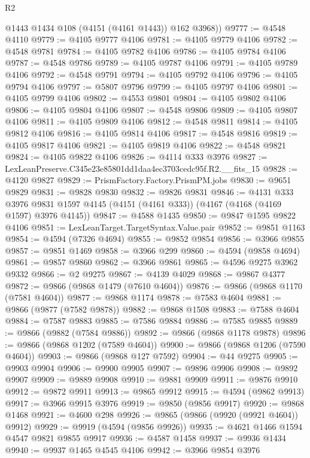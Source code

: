 \begin{lexlean}{R2}
\begin{coremodule}
        @1443
        @1434
        @108
        (@4151 (@4161 @1443))
        @162
        @3968))
@9777 := @4548 @4110
@9779 := @4105 @9777 @4106
@9781 := @4105 @9779 @4106
@9782 := @4548 @9781
@9784 := @4105 @9782 @4106
@9786 := @4105 @9784 @4106
@9787 := @4548 @9786
@9789 := @4105 @9787 @4106
@9791 := @4105 @9789 @4106
@9792 := @4548 @9791
@9794 := @4105 @9792 @4106
@9796 := @4105 @9794 @4106
@9797 := @5807 @9796
@9799 := @4105 @9797 @4106
@9801 := @4105 @9799 @4106
@9802 := @4553 @9801
@9804 := @4105 @9802 @4106
@9806 := @4105 @9804 @4106
@9807 := @4548 @9806
@9809 := @4105 @9807 @4106
@9811 := @4105 @9809 @4106
@9812 := @4548 @9811
@9814 := @4105 @9812 @4106
@9816 := @4105 @9814 @4106
@9817 := @4548 @9816
@9819 := @4105 @9817 @4106
@9821 := @4105 @9819 @4106
@9822 := @4548 @9821
@9824 := @4105 @9822 @4106
@9826 := @4114 @333 @3976
@9827 := LexLeanPreserve.C345e23e85801dd1daa4ec3703cedc95f.R2.__fits_15
@9828 := @4120 @9827
@9829 := PrismFactory.Factory.PrismPM.jobs
@9830 := @9651 @9829
@9831 := @9828 @9830
@9832 := @9826 @9831
@9846 := @4131
    @333
    @3976
    @9831
    @1597
    @4145
    (@4151 (@4161 @333))
    (@4167 (@4168 (@4169 @1597) @3976 @4145))
@9847 := @4588 @1435
@9850 := @9847 @1595 @9822 @4106
@9851 := LexLeanTarget.TargetSyntax.Value.pair
@9852 := @9851 @1163
@9854 := @4594 (@7326 @4694)
@9855 := @9852 @9854
@9856 := @3966 @9855
@9857 := @9851 @1469
@9858 := @3966 @299
@9860 := @4594 (@9858 @4694)
@9861 := @9857 @9860
@9862 := @3966 @9861
@9865 := @4596 @9275 @3962 @9332
@9866 := @2 @9275
@9867 := @4139 @4029
@9868 := @9867 @4377
@9872 := @9866 (@9868 @1479 (@7610 @4604))
@9876 := @9866 (@9868 @1170 (@7581 @4604))
@9877 := @9868 @1174
@9878 := @7583 @4604
@9881 := @9866 (@9877 (@7582 @9878))
@9882 := @9868 @1508
@9883 := @7588 @4604
@9884 := @7587 @9883
@9885 := @7586 @9884
@9886 := @7585 @9885
@9889 := @9866 (@9882 (@7584 @9886))
@9892 := @9866 (@9868 @1178 @9878)
@9896 := @9866 (@9868 @1202 (@7589 @4604))
@9900 := @9866 (@9868 @1206 (@7590 @4604))
@9903 := @9866 (@9868 @127 @7592)
@9904 := @44 @9275
@9905 := @9903 @9904
@9906 := @9900 @9905
@9907 := @9896 @9906
@9908 := @9892 @9907
@9909 := @9889 @9908
@9910 := @9881 @9909
@9911 := @9876 @9910
@9912 := @9872 @9911
@9913 := @9865 @9912
@9915 := @4594 (@9862 @9913)
@9917 := @3966 @9915 @3976
@9919 := @9850 (@9856 @9917)
@9920 := @9868 @1468
@9921 := @4600 @298
@9926 := @9865 (@9866 (@9920 (@9921 @4604)) @9912)
@9929 := @9919 (@4594 (@9856 @9926))
@9935 := @4621 @1466 @1594 @4547 @9821 @9855 @9917
@9936 := @4587 @1458
@9937 := @9936 @1434
@9940 := @9937 @1465 @4545 @4106
@9942 := @3966 @9854 @3976

\end{coremodule}
\end{lexlean}
